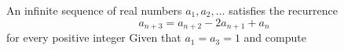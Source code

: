 An infinite sequence of real numbers $a_1, a_2, \dots$ satisfies the recurrence
\[ a_{n+3} = a_{n+2} - 2a_{n+1} + a_n \]for every positive integer  Given that $a_1 = a_3 = 1$ and  compute 